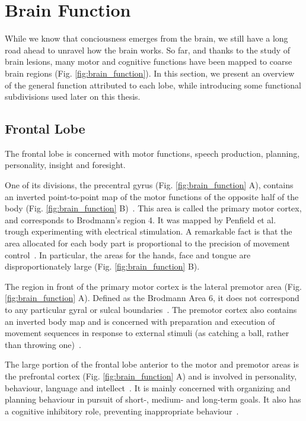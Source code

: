 \section{Brain Function}

While we know that conciousness emerges from the brain, we still have a long road
ahead to unravel how the brain works. So far, and thanks to the study of
brain lesions, many motor and cognitive functions have been mapped to coarse
brain regions (Fig. \ref{fig:brain_function}). In this section, we present an
overview of the general function attributed to each lobe, while introducing 
some functional subdivisions used later on this thesis.

\subsection{Frontal Lobe}
The frontal lobe is concerned with motor functions, speech production, 
planning, personality, insight and foresight.

One of its divisions, the precentral gyrus (Fig. \ref{fig:brain_function} A),
contains an inverted point-to-point map of the motor functions of the opposite
half of the body (Fig. \ref{fig:brain_function} B)~\cite{Johns, Purves2004,
Catani2012}. This area is called the primary motor cortex, and corresponds to
Brodmann's region 4. It was mapped by Penfield et al.~\cite{Penfield1954} trough
experimenting with electrical stimulation. A remarkable fact is that the area
allocated for each body part is proportional to the precision of movement
control~\cite{Johns}. In particular, the areas for the hands, face and tongue
are disproportionately large (Fig. \ref{fig:brain_function} B).

The region in front of the primary motor cortex is the lateral premotor area (Fig. \ref{fig:brain_function} A).
Defined as the Brodmann Area 6, it does not correspond to any particular gyral
or sulcal boundaries~\cite{Johns, Purves2004}. The premotor cortex also contains
an inverted body map and is concerned with preparation and execution of movement
sequences in response to external stimuli (as catching a ball, rather than throwing one)~\cite{Johns}.

The large portion of the frontal lobe anterior to the motor
and premotor areas is the prefrontal cortex (Fig. \ref{fig:brain_function} A) and is involved in personality, 
behaviour, language and intellect~\cite{Johns}. It is mainly concerned with
organizing and planning behaviour in pursuit of short-, medium- and long-term goals.
It also has a cognitive inhibitory role, preventing inappropriate behaviour~\cite{Sigman2017}.

